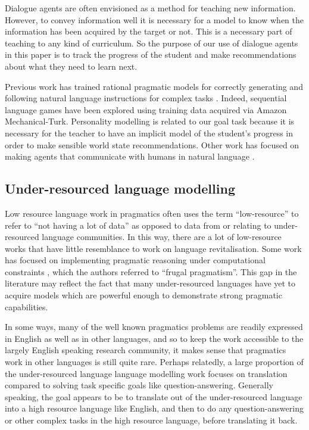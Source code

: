Dialogue agents are often envisioned as a method for teaching new information. However, to convey information well it is necessary for a model to know when the information has been acquired by the target or not. This is a necessary part of teaching to any kind of curriculum. So the purpose of our use of dialogue agents in this paper is to track the progress of the student and make recommendations about what they need to learn next.

Previous work has trained rational pragmatic models for correctly generating and following natural language instructions for complex tasks \cite{fried2017unified}. Indeed, sequential language games \cite{khani2018planning} have been explored using training data acquired via Amazon Mechanical-Turk. Personality modelling \cite{yang2020improving} is related to our goal task because it is necessary for the teacher to have an implicit model of the student's progress in order to make sensible world state recommendations. Other work has focused on making agents that communicate with humans in natural language \cite{lazaridou2020multi}.

\subsection{Under-resourced language modelling}

Low resource language work in pragmatics often uses the term ``low-resource'' to refer to ``not having a lot of data'' as opposed to data from or relating to under-resourced language communities. In this way, there are a lot of low-resource works that have little resemblance to work on language revitalisation. Some work has focused on implementing pragmatic reasoning under computational constraints \cite{van2020simple}, which the authors referred to ``frugal pragmatism''. This gap in the literature may reflect the fact that many under-resourced languages have yet to acquire models which are powerful enough to demonstrate strong pragmatic capabilities.

In some ways, many of the well known pragmatics problems are readily expressed in English as well as in other languages, and so to keep the work accessible to the largely English speaking research community, it makes sense that pragmatics work in other languages is still quite rare. Perhaps relatedly, a large proportion of the under-resourced language language modelling work focuses on translation compared to solving task specific goals like question-answering. Generally speaking, the goal appears to be to translate out of the under-resourced language into a high resource language like English, and then to do any question-answering or other complex tasks in the high resource language, before translating it back.
